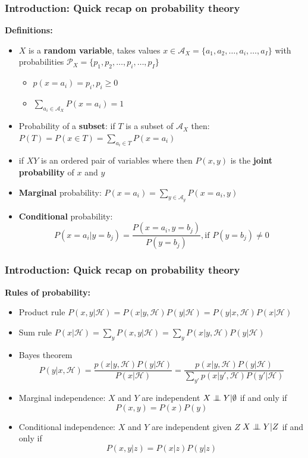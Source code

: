 \documentclass[slidestop,compress,mathserif]{beamer}
\newcommand{\bi}{\begin{itemize}}
\newcommand{\ei}{\end{itemize}}
\newcommand{\bis}{\begin{itemize}[<+->]}
\newcommand{\eis}{\end{itemize}}
\newcommand{\indep}{\ensuremath{\perp\mkern -10mu \perp}}
\begin{document}
\begin{frame}
	\frametitle{Introduction: Quick recap on probability theory}
    \textbf{Definitions:}
    \bis
    \item $X$ is a \textbf{random variable}, takes values $x\in\mathcal{A}_X=
        \{a_1,a_2,\hdots,a_i,\hdots,a_I\}$ with probabilities 
        $\mathcal{P}_X=\{p_1,p_2,\hdots,p_i,\hdots,p_I\}$
        \bi
        \item $p(x=a_i)=p_i, p_i \geq 0$
        \item $\sum_{a_i\in\mathcal{A}_X}P(x=a_i)=1$
        \ei
    \item Probability of a \textbf{subset}:
    if $T$ is a subset of $\mathcal{A}_X$ then:
    $P(T) = P(x\in T) = \sum_{a_i\in T}P(x=a_i)$
    \item if $XY$ is an ordered pair of variables where 
    then $P(x,y)$ is the \textbf{joint probability} of $x$ and $y$
    \item \textbf{Marginal} probability:
    $P(x=a_i) = \sum_{y\in\mathcal{A}_y} P(x=a_i,y)$
    \item \textbf{Conditional} probability:
    $$P(x=a_i|y=b_j) = \frac{P(x=a_i,y=b_j)}{P(y=b_j)}, \text{if $P(y=b_j)\neq0$}$$
    \eis
\end{frame}

\begin{frame}
	\frametitle{Introduction: Quick recap on probability theory}
    \textbf{Rules of probability:}
    \bis
    \item Product rule
    $P(x,y|\mathcal{H})=P(x|y,\mathcal{H})P(y|\mathcal{H})=P(y|x,\mathcal{H})P(x|\mathcal{H})$
    \item Sum rule
    $P(x|\mathcal{H})=\sum_y P(x,y|\mathcal{H}) = \sum_y P(x|y,\mathcal{H})P(y|\mathcal{H})$
    \item Bayes theorem
    $$P(y|x,\mathcal{H})=\frac{p(x|y,\mathcal{H})P(y|\mathcal{H})}{P(x|\mathcal{H})}
        =\frac{p(x|y,\mathcal{H})P(y|\mathcal{H})}{\sum_{y'}p(x|y',\mathcal{H})P(y'|\mathcal{H})}$$
    \item Marginal independence: $X$ and $Y$ are independent $X\indep Y|\emptyset$ if and only if
    $$P(x,y)=P(x)P(y)$$
    \item Conditional independence: $X$ and $Y$ are independent given $Z$ 
    $X\indep Y|Z$ if and only if
    $$P(x,y|z)=P(x|z)P(y|z)$$
    \eis
\end{frame}
\end{document}
